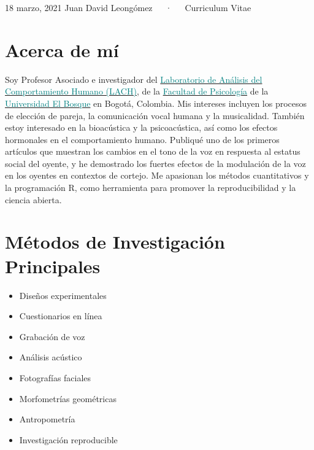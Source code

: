\documentclass[11pt, a4paper]{awesome-cv}
\begin{document}
\makecvheader

\makecvfooter
  {18 marzo, 2021}
    {Juan David Leongómez~~~·~~~Curriculum Vitae}
  {\thepage}





\hypertarget{acerca-de-muxed}{%
\section{Acerca de mí}\label{acerca-de-muxed}}

Soy Profesor Asociado e investigador del
\href{https://sites.google.com/unbosque.edu.co/lach-es}{\textcolor{teal}{Laboratorio de Análisis del Comportamiento Humano (LACH)}},
de la
\href{https://www.uelbosque.edu.co/psicologia}{\textcolor{teal}{Facultad de Psicología}}
de la
\href{https://www.uelbosque.edu.co/}{\textcolor{teal}{Universidad El Bosque}}
en Bogotá, Colombia. Mis intereses incluyen los procesos de elección de
pareja, la comunicación vocal humana y la musicalidad. También estoy
interesado en la bioacústica y la psicoacústica, así como los efectos
hormonales en el comportamiento humano. Publiqué uno de los primeros
artículos que muestran los cambios en el tono de la voz en respuesta al
estatus social del oyente, y he demostrado los fuertes efectos de la
modulación de la voz en los oyentes en contextos de cortejo. Me
apasionan los métodos cuantitativos y la programación R, como
herramienta para promover la reproducibilidad y la ciencia abierta.

\hypertarget{muxe9todos-de-investigaciuxf3n-principales}{%
\section{Métodos de Investigación
Principales}\label{muxe9todos-de-investigaciuxf3n-principales}}

\begin{multicols}{2}
\begin{itemize}
 \item Diseños experimentales
 \item Cuestionarios en línea 
 \item Grabación de voz
 \item Análisis acústico
 \item Fotografías faciales
 \item Morfometrías geométricas
 \item Antropometría
 \item Investigación reproducible
\end{itemize}
\end{multicols}
\end{document}
